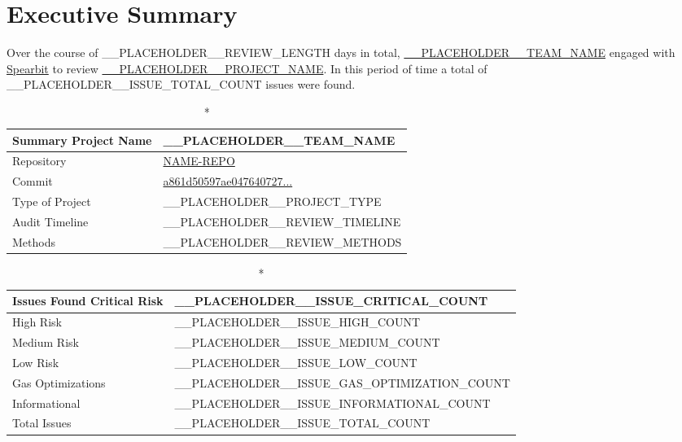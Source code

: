  
\hypertarget{executive-summary}{%
\section{Executive Summary}\label{executive-summary}}

Over the course of __PLACEHOLDER__REVIEW_LENGTH days in total, \href{__PLACEHOLDER__TEAM_WEBSITE}{__PLACEHOLDER__TEAM_NAME} engaged with
\href{https://spearbit.com}{Spearbit} to review
\href{__PLACEHOLDER__PROJECT_WEBSITE}{__PLACEHOLDER__PROJECT_NAME}. In this period of
time a total of __PLACEHOLDER__ISSUE_TOTAL_COUNT issues were found. 

\vspace{1cm}

\begin{longtable}{|p{3cm}|p{6cm}|}
    \caption*{\textbf{Summary}}
    \hline
    Project Name & __PLACEHOLDER__TEAM_NAME \\
    \hline
    Repository & \href{https://github.com/GITHUB-REPO}{NAME-REPO} \\
    \hline
    Commit & \href{https://github.com/PROJECTNAME/PROJECT-CONTRACT/blob/a861d50597ae047640727fd63afc3c3a9b0e1cbc}{a861d50597ae047640727...} \\
    \hline
    Type of Project & __PLACEHOLDER__PROJECT_TYPE \\
    \hline
    Audit Timeline & __PLACEHOLDER__REVIEW_TIMELINE \\
    \hline
    Methods & __PLACEHOLDER__REVIEW_METHODS \\
    \hline
\end{longtable}



\begin{longtable}{|p{3cm}|p{6cm}|}
    \caption*{\textbf{Issues Found}}
    \hline Critical Risk & __PLACEHOLDER__ISSUE_CRITICAL_COUNT \\
    \hline High Risk & __PLACEHOLDER__ISSUE_HIGH_COUNT \\
    \hline Medium Risk & __PLACEHOLDER__ISSUE_MEDIUM_COUNT \\ 
    \hline Low Risk & __PLACEHOLDER__ISSUE_LOW_COUNT \\
    \hline Gas Optimizations & __PLACEHOLDER__ISSUE_GAS_OPTIMIZATION_COUNT \\ 
    \hline Informational & __PLACEHOLDER__ISSUE_INFORMATIONAL_COUNT \\
    \hline Total Issues & __PLACEHOLDER__ISSUE_TOTAL_COUNT \\
    \hline
\end{longtable}



